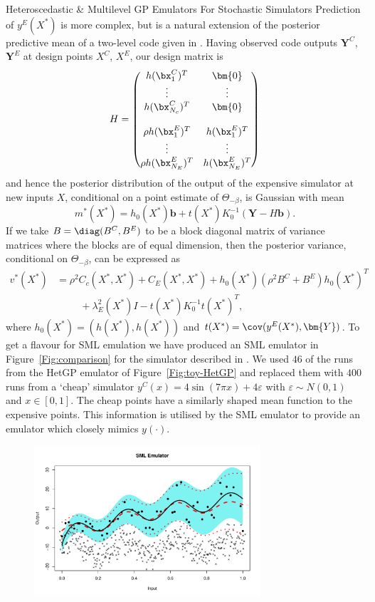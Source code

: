 \begin{chapter}{Heteroscedastic \& Multilevel GP Emulators For Stochastic Simulators\label{Ch:Hetsml}}
Prediction of  $y^E(X^{*})$  is more complex, but is a natural extension of the posterior predictive mean of a two-level code given in \cite{Kennedy2000}. Having observed code outputs $\bm{Y}^C$, $\bm{Y}^E$ at design points $X^C$, $X^E$, our design matrix is
\begin{equation}
H = \begin{pmatrix}
h(\bx^C_1)^T & \bm{0} \\
\vdots & \vdots \\
h(\bx^C_{N_c})^T & \bm{0} \\
 & \\
\rho h(\bx^E_1)^T & h(\bx^E_1)^T \\
\vdots & \vdots \\
\rho h(\bx^E_{N_E})^T & h(\bx^E_{N_E})^T
\end{pmatrix}
\end{equation}
and hence the posterior distribution of the output of the expensive simulator at new inputs $X$, conditional on a point estimate of $\Theta_{-\beta}$, is Gaussian with mean
\begin{equation*}
  m^{*}(X^*) = h_0(X^*) \bm{b} + t(X^*)K_0^{-1}\left( \bm{Y} - H\bm{b} \right).
\end{equation*}
If we take $B = \diag(B^C, B^E)$ to be a block diagonal matrix of variance matrices where the blocks are of equal dimension, then the posterior variance, conditional on $\Theta_{-\beta}$, can be expressed as
\begin{align}
  v^{*}(X^*) &= \rho^2 C_c(X^*,X^*) + C_E(X^*,X^*) + h_0(X^*)(\rho^2B^C + B^E)h_0(X^*)^T\\
    &\hspace{1cm}+\lambda^2_E(X^*)I - t(X^*)K_0^{-1}t(X^*)^T,
\end{align}
where $h_0(X^*) = ( h(X^*), h(X^*))$ and $t(X^*)=\cov(y^E(X^*), \bm{Y})$.
To get a flavour for SML emulation we have produced an SML emulator in Figure~\ref{Fig:comparison} for the simulator described in \label{hetgp-shortcomings}. We used $46$ of the runs from the HetGP emulator of Figure~\ref{Fig:toy-HetGP} and replaced them with $400$ runs from a `cheap' simulator $y^C(x) = 4 \sin (7\pi x) + 4\varepsilon$ with $\varepsilon \sim N(0,1)$ and $x \in [0,1]$.  The cheap points have a similarly shaped mean function to the expensive points. This information is utilised by the SML emulator to provide an emulator which closely mimics $y(\cdot)$.
\begin{figure}[ht]
\centering
	\includegraphics[width=0.75\textwidth]{sml-het-fig2/toy-sml.pdf}

\end{figure}
\end{chapter}
